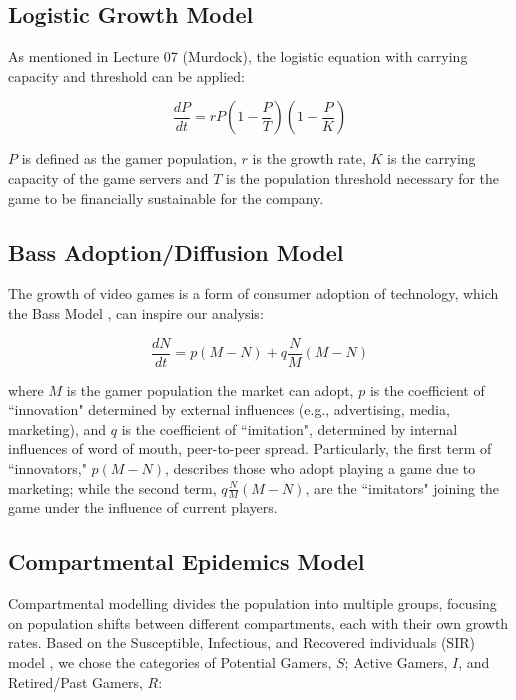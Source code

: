 \documentclass{article}
\begin{document}


\subsection{Logistic Growth Model}
As mentioned in Lecture 07 (Murdock), the logistic equation with carrying capacity and threshold can be applied: 

\begin{equation}
    \frac{dP}{dt} = rP \left(1 - \frac{P}{T}\right)\left(1 - \frac{P}{K}\right)
\end{equation}

\noindent $P$ is defined as the gamer population, $r$ is the growth rate, $K$ is the carrying capacity of the game servers and $T$ is the population threshold necessary for the game to be financially sustainable for the company.  

\subsection{Bass Adoption/Diffusion Model}
The growth of video games is a form of consumer adoption of technology, which the Bass Model \cite{916272ae-6b7a-3e62-b7e2-5747187dae7b, f1542a98-16de-3de1-ac28-c48c9779e63f}, can inspire our analysis: 

\begin{equation}
    \frac{dN}{dt} = p \left(M - N\right) + q \frac{N}{M} \left(M - N\right)
\end{equation}

\noindent where $M$ is the gamer population the market can adopt, $p$ is the coefficient of ``innovation" determined by external influences (e.g., advertising, media, marketing), and $q$ is the coefficient of ``imitation", determined by internal influences of word of mouth, peer-to-peer spread. Particularly, the first term of ``innovators," $p \left(M - N\right)$, describes those who adopt playing a game due to marketing; while the second term, $ q \frac{N}{M} \left(M - N\right) $, are the ``imitators" joining the game under the influence of current players. 


\subsection{Compartmental Epidemics Model}
Compartmental modelling divides the population into multiple groups, focusing on population shifts between different compartments, each with their own growth rates. Based on the Susceptible, Infectious, and Recovered individuals (SIR) model \cite{Hethcote2000Mathematics}, we chose the categories of Potential Gamers, $S$; Active Gamers, $I$, and Retired/Past Gamers, $R$:
\end{document}
